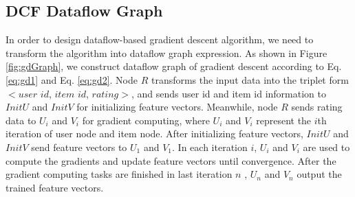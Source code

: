 \documentclass{llncs}
\begin{document}
\subsection{DCF Dataflow Graph}
\vspace{-5pt}
In order to design dataflow-based gradient descent algorithm, we need to transform the algorithm into dataflow graph expression. As shown in Figure \ref{fig:gdGraph}, we construct dataflow graph of gradient descent according to Eq. \ref{eq:gd1} and Eq. \ref{eq:gd2}. Node $R$ transforms the input data into the triplet form $<user$ $id$, $item$ $id$, $rating>$, and sends user id and item id information to $InitU$ and $InitV$ for initializing feature vectors.
Meanwhile, node $R$ sends rating data to $U_i$ and $V_i$ for gradient computing, where $U_i$ and $V_i$ represent the $i$th iteration of user node and item node. After initializing feature vectors, $InitU$ and $InitV$ send feature vectors to $U_1$ and $V_1$. In each iteration $i$, $U_i$ and $V_i$ are used to compute the gradients and update feature vectors until convergence. After the gradient computing tasks are finished in last iteration $n$ , $U_n$ and $V_n$ output the trained feature vectors.

\vspace{-15pt}
\end{document}
